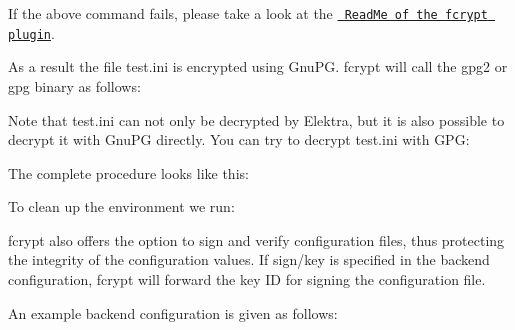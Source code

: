 \begin{DoxyCode}{0}
\end{DoxyCode}


If the above command fails, please take a look at the \href{https://master.libelektra.org/src/plugins/fcrypt/README.md\#known-issues}{\texttt{ Read\+Me of the {\ttfamily fcrypt} plugin}}.

As a result the file {\ttfamily test.\+ini} is encrypted using Gnu\+PG. {\ttfamily fcrypt} will call the {\ttfamily gpg2} or {\ttfamily gpg} binary as follows\+:


\begin{DoxyCode}{0}
\end{DoxyCode}


Note that {\ttfamily test.\+ini} can not only be decrypted by Elektra, but it is also possible to decrypt it with Gnu\+PG directly. You can try to decrypt {\ttfamily test.\+ini} with G\+PG\+:


\begin{DoxyCode}{0}
\end{DoxyCode}


The complete procedure looks like this\+:


\begin{DoxyCode}{0}
\end{DoxyCode}


To clean up the environment we run\+:


\begin{DoxyCode}{0}
\end{DoxyCode}


{\ttfamily fcrypt} also offers the option to sign and verify configuration files, thus protecting the integrity of the configuration values. If {\ttfamily sign/key} is specified in the backend configuration, {\ttfamily fcrypt} will forward the key ID for signing the configuration file.

An example backend configuration is given as follows\+:


\begin{DoxyCode}{0}
\end{DoxyCode}


